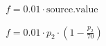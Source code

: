 \documentclass{article}
\begin{document}
$ f = 0.01 \cdot \text{source.value} $
\pagebreak

$ f = 0.01 \cdot p_2 \cdot \left(1 - \frac{p_2}{70}\right) $
\pagebreak
\end{document}
